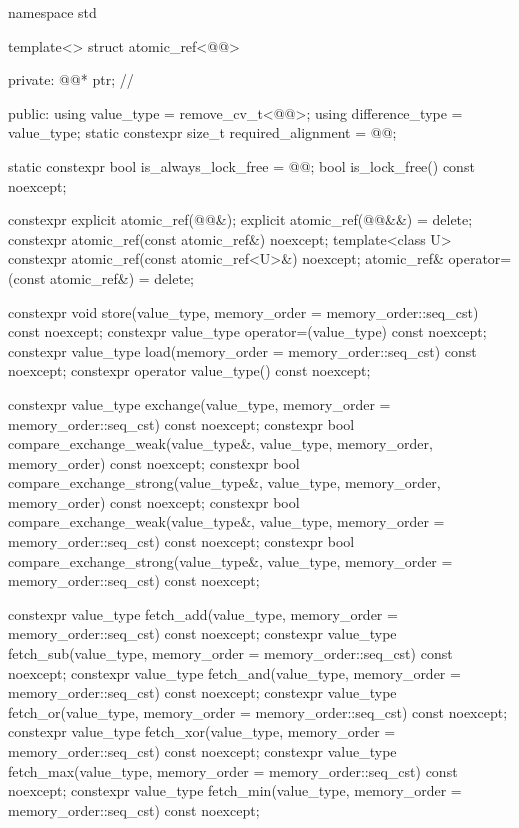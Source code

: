 \begin{codeblock}
namespace std {
  template<> struct atomic_ref<@@> {
  private:
    @@* ptr;         // \expos

  public:
    using value_type = remove_cv_t<@@>;
    using difference_type = value_type;
    static constexpr size_t required_alignment = @@;

    static constexpr bool is_always_lock_free = @@;
    bool is_lock_free() const noexcept;

    constexpr explicit atomic_ref(@@&);
    explicit atomic_ref(@@&&) = delete;
    constexpr atomic_ref(const atomic_ref&) noexcept;
    template<class U>
      constexpr atomic_ref(const atomic_ref<U>&) noexcept;
    atomic_ref& operator=(const atomic_ref&) = delete;

    constexpr void store(value_type, memory_order = memory_order::seq_cst) const noexcept;
    constexpr value_type operator=(value_type) const noexcept;
    constexpr value_type load(memory_order = memory_order::seq_cst) const noexcept;
    constexpr operator value_type() const noexcept;

    constexpr value_type exchange(value_type,
                                  memory_order = memory_order::seq_cst) const noexcept;
    constexpr bool compare_exchange_weak(value_type&, value_type,
                                         memory_order, memory_order) const noexcept;
    constexpr bool compare_exchange_strong(value_type&, value_type,
                                           memory_order, memory_order) const noexcept;
    constexpr bool compare_exchange_weak(value_type&, value_type,
                                         memory_order = memory_order::seq_cst) const noexcept;
    constexpr bool compare_exchange_strong(value_type&, value_type,
                                           memory_order = memory_order::seq_cst) const noexcept;

    constexpr value_type fetch_add(value_type,
                                   memory_order = memory_order::seq_cst) const noexcept;
    constexpr value_type fetch_sub(value_type,
                                   memory_order = memory_order::seq_cst) const noexcept;
    constexpr value_type fetch_and(value_type,
                                   memory_order = memory_order::seq_cst) const noexcept;
    constexpr value_type fetch_or(value_type,
                                  memory_order = memory_order::seq_cst) const noexcept;
    constexpr value_type fetch_xor(value_type,
                                   memory_order = memory_order::seq_cst) const noexcept;
    constexpr value_type fetch_max(value_type,
                                   memory_order = memory_order::seq_cst) const noexcept;
    constexpr value_type fetch_min(value_type,
                                   memory_order = memory_order::seq_cst) const noexcept;

}}
\end{codeblock}
